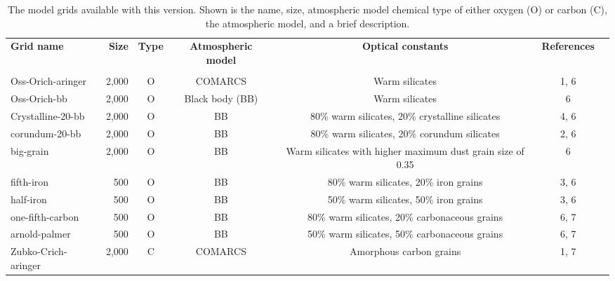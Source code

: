 \documentclass[onecolumn]{aastex63}
\begin{document}
\vspace{3cm}
\begin{table*}
    \centering
    \caption{The model grids available with this version. Shown is the name, size, atmospheric model chemical type of either oxygen (O) or carbon (C), the atmospheric model, and a brief description. \vspace{0.2cm}}
    \begin{tabular}{ l r c c c c c}
    \hline
    \textbf{Grid name} & \textbf{Size} & \textbf{Type} & \textbf{Atmospheric model} & \textbf{Optical constants} & \textbf{References} \\
    \Xhline{3\arrayrulewidth} \\
    \vspace{0.1cm}
    Oss-Orich-aringer & 2,000 & O & COMARCS & Warm silicates & 1, 6 \\
    \vspace{0.1cm}
    Oss-Orich-bb & 2,000 & O & Black body (BB) & Warm silicates & 6\\
    \vspace{0.1cm}
    Crystalline-20-bb & 2,000 & O & BB & 80\% warm silicates, 20\% crystalline silicates & 4, 6\\
    \vspace{0.1cm}
    corundum-20-bb & 2,000 & O & BB & 80\% warm silicates, 20\% corundum silicates &  2, 6\\
    \vspace{0.1cm}
    big-grain & 2,000 & O & BB & Warm silicates with higher maximum dust grain size of 0.35 &  6\\
    \vspace{0.1cm}
    fifth-iron & 500 & O & BB & 80\% warm silicates, 20\% iron grains &  3, 6\\
    \vspace{0.1cm}
    half-iron & 500 & O & BB & 50\% warm silicates, 50\% iron grains &  3, 6 \\
    \vspace{0.1cm}
    one-fifth-carbon & 500 & O & BB & 80\% warm silicates, 20\% carbonaceous grains &  6, 7\\
    \vspace{0.1cm}
    arnold-palmer & 500 & O & BB & 50\% warm silicates, 50\% carbonaceous grains &  6, 7\\
    \vspace{0.1cm}
    Zubko-Crich-aringer & 2,000 & C & COMARCS & Amorphous carbon grains &  1, 7\\

\end{tabular}
\end{table*}
\end{document}
